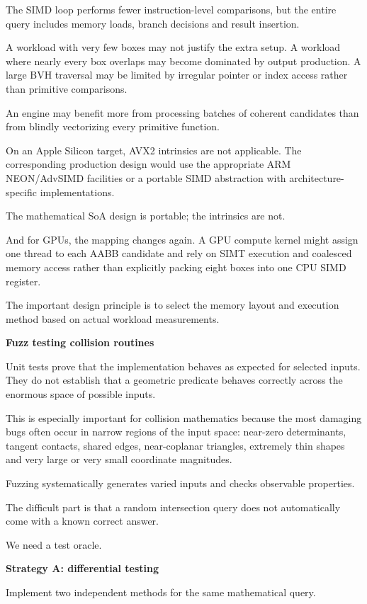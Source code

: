 The SIMD loop performs fewer instruction-level comparisons, but the entire query includes memory loads, branch decisions and result insertion.

A workload with very few boxes may not justify the extra setup. A workload where nearly every box overlaps may become dominated by output production. A large BVH traversal may be limited by irregular pointer or index access rather than primitive comparisons.

An engine may benefit more from processing batches of coherent candidates than from blindly vectorizing every primitive function.

On an Apple Silicon target, AVX2 intrinsics are not applicable. The corresponding production design would use the appropriate ARM NEON/AdvSIMD facilities or a portable SIMD abstraction with architecture-specific implementations.

The mathematical SoA design is portable; the intrinsics are not.

And for GPUs, the mapping changes again. A GPU compute kernel might assign one thread to each AABB candidate and rely on SIMT execution and coalesced memory access rather than explicitly packing eight boxes into one CPU SIMD register.

The important design principle is to select the memory layout and execution method based on actual workload measurements.

\textbf{Fuzz testing collision routines}

Unit tests prove that the implementation behaves as expected for selected inputs. They do not establish that a geometric predicate behaves correctly across the enormous space of possible inputs.

This is especially important for collision mathematics because the most damaging bugs often occur in narrow regions of the input space: near-zero determinants, tangent contacts, shared edges, near-coplanar triangles, extremely thin shapes and very large or very small coordinate magnitudes.

Fuzzing systematically generates varied inputs and checks observable properties.

The difficult part is that a random intersection query does not automatically come with a known correct answer.

We need a test oracle.

\textbf{Strategy A: differential testing}

Implement two independent methods for the same mathematical query.

